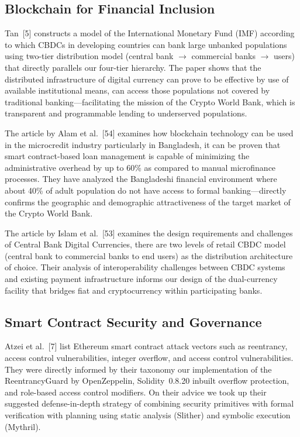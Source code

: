 \documentclass[12pt,a4paper]{report}
\begin{document}
\subsection{Blockchain for Financial Inclusion}

Tan~[5] constructs a model of the International Monetary Fund (IMF) according to which CBDCs in developing countries can bank large unbanked populations using two-tier distribution model (central bank $\to$ commercial banks $\to$ users) that directly parallels our four-tier hierarchy. The paper shows that the distributed infrastructure of digital currency can prove to be effective by use of available institutional means, can access those populations not covered by traditional banking---facilitating the mission of the Crypto World Bank, which is transparent and programmable lending to underserved populations.

The article by Alam et al.~[54] examines how blockchain technology can be used in the microcredit industry particularly in Bangladesh, it can be proven that smart contract-based loan management is capable of minimizing the administrative overhead by up to 60\% as compared to manual microfinance processes. They have analyzed the Bangladeshi financial environment where about 40\% of adult population do not have access to formal banking---directly confirms the geographic and demographic attractiveness of the target market of the Crypto World Bank.

The article by Islam et al.~[53] examines the design requirements and challenges of Central Bank Digital Currencies, there are two levels of retail CBDC model (central bank to commercial banks to end users) as the distribution architecture of choice. Their analysis of interoperability challenges between CBDC systems and existing payment infrastructure informs our design of the dual-currency facility that bridges fiat and cryptocurrency within participating banks.

\subsection{Smart Contract Security and Governance}

Atzei et al.~[7] list Ethereum smart contract attack vectors such as reentrancy, access control vulnerabilities, integer overflow, and access control vulnerabilities. They were directly informed by their taxonomy our implementation of the ReentrancyGuard by OpenZeppelin, Solidity~0.8.20 inbuilt overflow protection, and role-based access control modifiers. On their advice we took up their suggested defense-in-depth strategy of combining security primitives with formal verification with planning using static analysis (Slither) and symbolic execution (Mythril).
\end{document}
